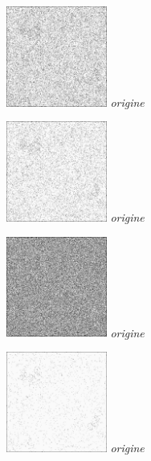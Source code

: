 \documentclass[a4,12pt]{article}
\begin{document}
\begin{minipage}[c]{0.20\linewidth}
	\begin{center}
		\includegraphics[width = 33mm]{./img/p2test_grad_fin_globules10_t25.jpg}
		\textit{origine}
	\end{center}
\end{minipage}
\begin{minipage}[c]{0.20\linewidth}
	\begin{center}
		\includegraphics[width = 33mm]{./img/p2test_grad_fin_globules10_t35.jpg}
		\textit{origine}
	\end{center}
\end{minipage}
\begin{minipage}[c]{0.20\linewidth}
	\begin{center}
		\includegraphics[width = 33mm]{./img/p2test_grad_fin_globules10_t3.jpg}
		\textit{origine}
	\end{center}
\end{minipage}
\begin{minipage}[c]{0.20\linewidth}
	\begin{center}
		\includegraphics[width = 33mm]{./img/p2test_grad_fin_globules10_t55.jpg}
		\textit{origine}
	\end{center}
\end{minipage}
\end{document}
